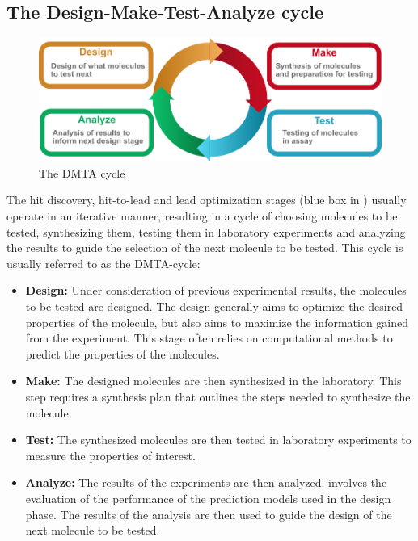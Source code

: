 \subsection{The Design-Make-Test-Analyze cycle}
\begin{figure}
      \centering
      \includegraphics[width=\textwidth]{figures/dmta_cycle.pdf}
      \caption{The DMTA cycle}
\end{figure}
The hit discovery, hit-to-lead and lead optimization stages (blue box in
) usually operate in an iterative manner, resulting in a cycle of
choosing molecules to be tested, synthesizing them, testing them in laboratory experiments and
analyzing the results to guide the selection of the next molecule to be tested. This cycle is
usually referred to as the \ac{DMTA}-cycle:
\begin{itemize}
      \item \textbf{Design:} Under consideration of previous experimental results, the molecules to
            be tested are designed. The design generally aims to optimize the desired properties of
            the molecule, but also aims to maximize the information gained from the experiment. This
            stage often relies on computational methods to predict the properties of the molecules.
      \item \textbf{Make:} The designed molecules are then synthesized in the laboratory. This step
            requires a synthesis plan that outlines the steps needed to synthesize the molecule.
      \item \textbf{Test:} The synthesized molecules are then tested in laboratory experiments to
            measure the properties of interest.
      \item \textbf{Analyze:} The results of the experiments are then analyzed. involves the
            evaluation of the performance of the prediction models used in the design phase. The
            results of the analysis are then used to guide the design of the next molecule to be
            tested.
\end{itemize}

